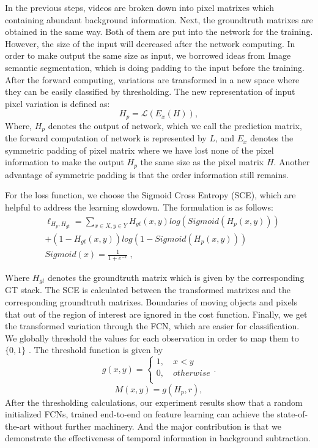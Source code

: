 \documentclass[journal]{IEEEtran}
\begin{document}
In the previous steps, videos are broken down into pixel matrixes which containing abundant background information. 
Next, the groundtruth matrixes are obtained in the same way. 
Both of them are put into the network for the training. 
However, the size of the input will decreased after the network computing. 
In order to make output the same size as input, we borrowed ideas from Image semantic segmentation, which is doing padding to the input before the training. 
After the forward computing, variations are transformed in a new space where they can be easily classified by thresholding. 
The new representation of input pixel variation is defined as:
\begin{equation}
H_p= \mathcal L (E_x (H)),
\end{equation}
Where, $H_p$ denotes the output of network, which we call the prediction matrix, the forward computation of network is represented by $L$, and $E_x$ denotes the symmetric padding of pixel matrix where we have lost none of the pixel information to make the output $H_p$ the same size as the pixel matrix $H$. 
Another advantage of symmetric padding is that the order information still remains.

For the loss function, we choose the Sigmoid Cross Entropy (SCE), which are helpful to address the learning slowdown. 
The formulation is as follows:
\begin{equation}
    \begin{aligned}
        & \ell_{H_p, H_{gt}} =  \sum\limits_{x \in X, y \in Y}^{} H_{gt}(x,y) log(Sigmoid(H_p(x,y)))  \\
        & + (1 - H_{gt}(x,y)) log(1 - Sigmoid(H_p(x,y))) \\
        & Sigmoid(x) =\frac{1}{1+e^{-x}}\  ,
    \end{aligned}
\end{equation}

Where $H_{gt}$ denotes the groundtruth matrix which is given by the corresponding GT stack. 
The SCE is calculated between the transformed matrixes and the corresponding groundtruth matrixes. 
Boundaries of moving objects and pixels that out of the region of interest are ignored in the cost function.
Finally, we get the transformed variation through the FCN, which are easier for classification. 
We globally threshold the values for each observation in order to map them to $\{0,1\}$ . 
The threshold function is given by
\begin{equation}
    \label{piecewise_fg}
    g(x,y) =
 \begin{cases}
  1,  \quad x < y       \\
  0,  \quad otherwise   \\
\end{cases}.
\end{equation}
\begin{equation}
M(x,y)=g(H_p,r) ,
\end{equation}
After the thresholding calculations, our experiment results show that a random initialized FCNs, trained end-to-end on feature learning can achieve the state-of-the-art without further machinery. 
And the major contribution is that we demonstrate the effectiveness of temporal information in background 
subtraction.
\end{document}
